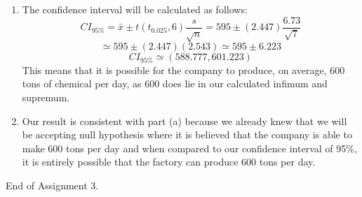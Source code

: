 \documentclass[12pt]{article}
\begin{document}
\begin{enumerate}
\begin{enumerate}
			\item The confidence interval will be calculated as follows:
			$$CI_{95\%} = \bar{x} \pm t(t_{0.025}, 6) \frac{s}{\sqrt{n}} = 595 \pm (2.447)\frac{6.73}{\sqrt{7}}$$
			$$\simeq 595 \pm (2.447)(2.543) \simeq 595 \pm 6.223$$
			$$CI_{95\%} \simeq (588.777, 601.223)$$
			This means that it is possible for the company to produce, on average, 600 tons of chemical per day, as 600 does lie in our calculated infimum and supremum.
			\item Our result is consistent with part (a) because we already knew that we will be accepting null hypothesis where it is believed that the company is able to make 600 tons per day and when compared to our confidence interval of 95\%, it is entirely possible that the factory can produce 600 tons per day.
		\end{enumerate}
\end{enumerate}
End of Assignment 3.
\end{document}
